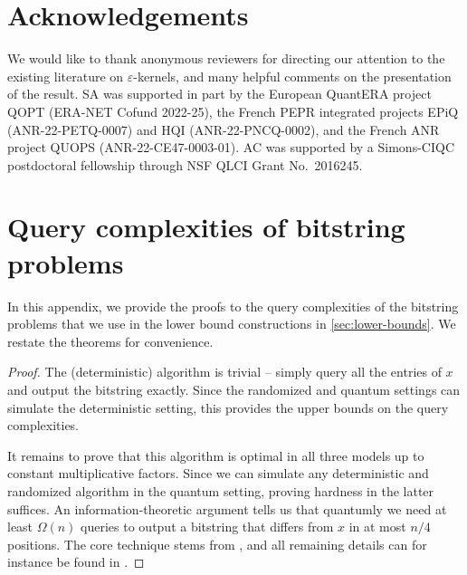 \documentclass[11pt]{article}
\begin{document}
    \section*{Acknowledgements}

    We would like to thank anonymous reviewers for directing our attention to the existing literature on $\varepsilon$-kernels, and many helpful comments on the presentation of the result.
    SA was supported in part by the European QuantERA project QOPT (ERA-NET Cofund 2022-25), the French PEPR integrated projects EPiQ (ANR-22-PETQ-0007) and HQI (ANR-22-PNCQ-0002), and the French ANR project QUOPS (ANR-22-CE47-0003-01).
    AC was supported by a Simons-CIQC postdoctoral fellowship through NSF QLCI Grant No.\ 2016245.

    
    

    \appendix

    \section{Query complexities of bitstring problems}
    \label{app:bit-string-problems}

    In this appendix, we provide the proofs to the query complexities of the bitstring problems that we use in the lower bound constructions in \cref{sec:lower-bounds}. We restate the theorems for convenience.

    \bitstringrecovery*

    \begin{proof}
        The (deterministic) algorithm is trivial -- simply query all the entries of $x$ and output the bitstring exactly. Since the randomized and quantum settings can simulate the deterministic setting, this provides the upper bounds on the query complexities.

        It remains to prove that this algorithm is optimal in all three models up to constant multiplicative factors. Since we can simulate any deterministic and randomized algorithm in the quantum setting, proving hardness in the latter suffices. An information-theoretic argument tells us that quantumly we need at least $\Omega(n)$ queries to output a bitstring that differs from $x$ in at most $n/4$ positions. The core technique stems from \cite{farhi1999bound}, and all remaining details can for instance be found in \cite[Lemma~4.6]{CHJ22}.
    \end{proof}

    \hammingweightestimation*
\end{document}
